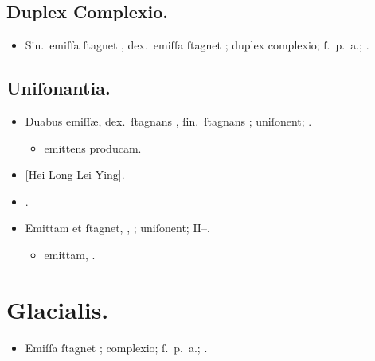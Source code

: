 \documentclass[12pt]{book}
\begin{document}
\subsection{Duplex Complexio.}\label{duplex-complexio}

\begin{itemize}
  \item Sin.\ emiſſa ſtagnet , dex.\ emiſſa ſtagnet ; duplex complexio; ſ.~p.~a.; .
\end{itemize}

\subsection{Uniſonantia.}\label{unisonantia}

\begin{itemize}
  \item Duabus emiſſæ, dex.\ ſtagnans , ſin.\ ſtagnans ; uniſonent; .
  \begin{itemize}
    \item \textelp{} emittens  producam.
  \end{itemize}
  \item {}[Hei Long Lei Ying].
  \item {}.
  \item Emittam et ſtagnet, , ; uniſonent;  II--.
  \begin{itemize}
    \item \textelp{} emittam, .
  \end{itemize}

\end{itemize}


\section{Glacialis.}\label{erebea-glacialis}

\begin{itemize}
  \item Emiſſa ſtagnet ; complexio; ſ.~p.~a.; .
\end{itemize}
\end{document}
